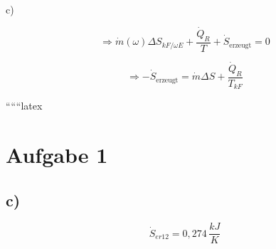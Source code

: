 c) \quad {}
\]

\[
\Rightarrow \dot{m}(\omega) \Delta S_{kF/\omega E} + \frac{\dot{Q}_R}{T} + \dot{S}_{\text{erzeugt}} = 0
\]

\[
\Rightarrow -\dot{S}_{\text{erzeugt}} = \dot{m} \Delta S + \frac{\dot{Q}_R}{T_{kF}}
\]

``````latex


\section*{Aufgabe 1}



\subsection*{c)}
\[
\dot{S}_{er12} = 0,274 \, \frac{kJ}{K}
\]